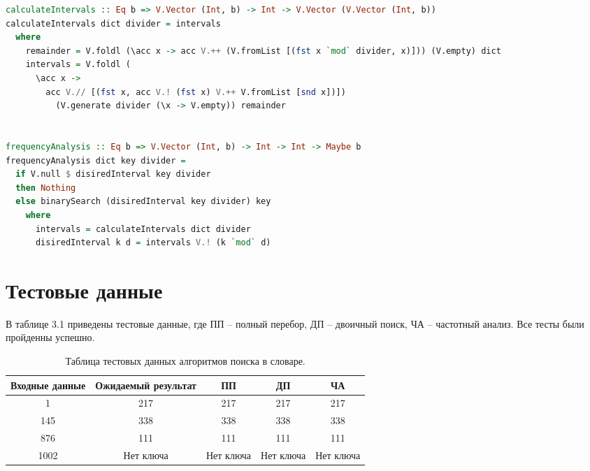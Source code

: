 \documentclass[12pt]{report}
\begin{document}
\begin{lstlisting}[label=some-code,caption=Алгоритм поиска с использованием частотного анализа, language=Haskell]
calculateIntervals :: Eq b => V.Vector (Int, b) -> Int -> V.Vector (V.Vector (Int, b))
calculateIntervals dict divider = intervals
  where 
    remainder = V.foldl (\acc x -> acc V.++ (V.fromList [(fst x `mod` divider, x)])) (V.empty) dict
    intervals = V.foldl (
      \acc x ->
        acc V.// [(fst x, acc V.! (fst x) V.++ V.fromList [snd x])])
          (V.generate divider (\x -> V.empty)) remainder


frequencyAnalysis :: Eq b => V.Vector (Int, b) -> Int -> Int -> Maybe b
frequencyAnalysis dict key divider = 
  if V.null $ disiredInterval key divider
  then Nothing 
  else binarySearch (disiredInterval key divider) key
    where
      intervals = calculateIntervals dict divider
      disiredInterval k d = intervals V.! (k `mod` d)
\end{lstlisting}
	
	
\section{Тестовые данные}

В таблице 3.1 приведены тестовые данные, где ПП -- полный перебор, ДП -- двоичный поиск, ЧА -- частотный анализ. Все тесты были пройденны успешно.

\begin{table}[H]
	\caption{Таблица тестовых данных алгоритмов поиска в словаре.}

	\begin{center}

		\begin{tabular}{|c c c c c|} 

			\hline

			Входные данные & Ожидаемый результат & ПП & ДП & ЧА \\  

			\hline

			1 & 217 & 217 & 217 & 217 \\

			\hline

			145 & 338 & 338 & 338 & 338 \\

			\hline

			876 & 111 & 111 & 111 & 111 \\

			\hline

			1002 & Нет ключа & Нет ключа & Нет ключа & Нет ключа \\
			\hline
		\end{tabular}

	\end{center}

\end{table}
	
\end{document}
